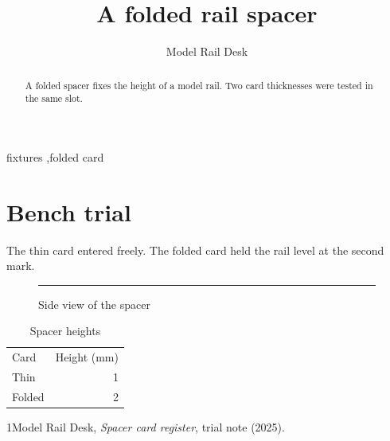 \documentclass[preprint]{elsarticle}
\begin{document}
\begin{frontmatter}\title{A folded rail spacer}\author[desk]{Model Rail Desk}\address[desk]{Paper Model Workshop}\begin{abstract}A folded spacer fixes the height of a model rail. Two card thicknesses were tested in the same slot.\end{abstract}\begin{keyword}fixtures \sep folded card\end{keyword}\end{frontmatter}
\section{Bench trial}
The thin card entered freely. The folded card held the rail level at the second mark.
\begin{figure}[ht]\centering\rule{28mm}{2mm}\caption{Side view of the spacer}\end{figure}
\begin{table}[ht]\centering\begin{tabular}{lr}Card&Height (mm)\\Thin&1\\Folded&2\end{tabular}\caption{Spacer heights}\end{table}
\begin{thebibliography}{1}Model Rail Desk, \emph{Spacer card register}, trial note (2025).\end{thebibliography}
\end{document}
